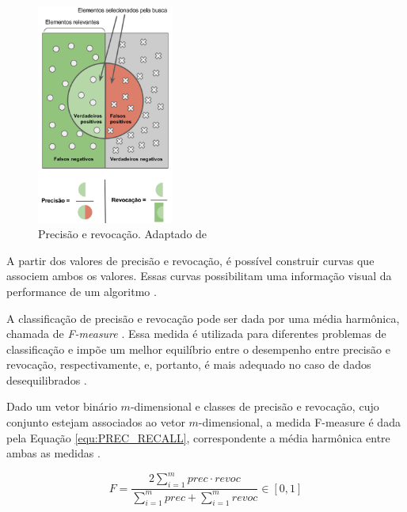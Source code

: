 \begin{document}
\begin{figure}[ht]
\centering
\includegraphics[width=0.4\textwidth]{precision_recall.png}
\caption{Precisão e revocação. Adaptado de \cite{WIKI_PREC_RECALL}}
\label{fig:PREC_RECALL}
\end{figure}

A partir dos valores de precisão e revocação, é possível construir curvas que associem ambos os valores. Essas curvas possibilitam uma informação visual da performance de um algoritmo \cite{PRECISION_RECALL}. 

A classificação de precisão e revocação pode ser dada por uma média harmônica, chamada de \textit{F-measure} \cite{F_MEASURE}. Essa medida é utilizada para diferentes problemas de classificação e impõe um melhor equilíbrio entre o desempenho entre precisão e revocação, respectivamente, e, portanto, é mais adequado no caso de dados desequilibrados \cite{F_MEASURE}. 

Dado um vetor binário $m$-dimensional e classes de precisão e revocação, cujo conjunto estejam associados ao vetor $m$-dimensional, a medida F-measure é dada pela Equação \ref{equ:PREC_RECALL}, correspondente a média harmônica entre ambas as medidas \cite{F_MEASURE}.

\begin{equation}
 F=\frac{ 2 \sum\limits_{i=1}^m {prec \cdot revoc}}{ \sum\limits_{i=1}^m {prec} + \sum\limits_{i=1}^m {revoc}}  \in [0,1]
 \label{equ:PREC_RECALL}
\end{equation}

\end{document}
